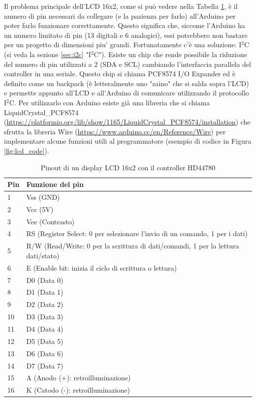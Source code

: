 \documentclass[12pt]{report}
\begin{document}
Il problema principale dell'LCD 16x2, come si può vedere nella Tabella \ref{tab:lcd_pinout}, è il numero di pin necessari da collegare (e la pazienza per farlo) all'Arduino per poter farlo funzionare correttamente. Questo significa che, siccome l'Arduino ha un numero limitato di pin (13 digitali e 6 analogici), essi potrebbero non bastare per un progetto di dimensioni piu' grandi. Fortunatamente c'è una soluzione: I$^2$C (si veda la sezione \ref{sec:i2c} "I$^2$C"). Esiste un chip che rende possibile la riduzione del numero di pin utilizzati a 2 (SDA e SCL) cambiando l'interfaccia parallela del controller in una seriale. Questo chip si chiama PCF8574 I/O Expander ed è definito come un backpack (è letteralmente uno "zaino" che si salda sopra l'LCD) e permette appunto all'LCD e all'Arduino di comunicare utilizzando il protocollo I$^2$C. Per utilizzarlo con Arduino esiste già una libreria che si chiama LiquidCrystal\_PCF8574 (\url{https://platformio.org/lib/show/1165/LiquidCrystal_PCF8574/installation}) che sfrutta la libreria Wire (\url{https://www.arduino.cc/en/Reference/Wire}) per implementare alcune funzioni utili al programmatore (esempio di codice in Figura \ref{fig:lcd_code}).


\begin{table}[h!]
	\begin{center}
		\begin{tabular}{l|l} 
			\textbf{Pin} & \textbf{Funzione del pin} \\
			\hline
			1 & Vss (GND) \\
			2 & Vcc (5V) \\ 
			3 & Vee (Contrasto) \\
			4 & RS (Register Select: 0 per selezionare l'invio di un comando, 1 per i dati) \\
			5 & R/W (Read/Write: 0 per la scrittura di dati/comandi, 1 per la lettura dati/stato) \\
			6 & E (Enable bit: inizia il ciclo di scrittura o lettura) \\
			7 & D0 (Data 0) \\
			8 & D1 (Data 1) \\
			9 & D2 (Data 2) \\
			10 & D3 (Data 3) \\
			11 & D4 (Data 4) \\
			12 & D5 (Data 5) \\
			13 & D6 (Data 6) \\
			14 & D7 (Data 7) \\
			15 & A (Anodo (+): retroilluminazione) \\
			16 & K (Catodo (-): retroilluminazione) \\
		\end{tabular}
	\caption{Pinout di un display LCD 16x2 con il controller HD44780}
	\label{tab:lcd_pinout}
	\end{center}
\end{table}
\end{document}

